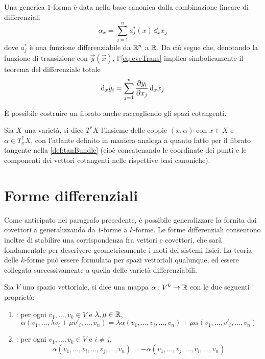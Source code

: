 Una generica $1$-forma è data nella base canonica dalla combinazione lineare di differenziali \begin{equation*}
\alpha_x = \sum_{j=1}^{n} a^*_j(x)\, \dd_x x_j
\end{equation*} 
dove $a_j^*$ è una funzione differenziabile da $\mathbb{R}^{n}$ a $\mathbb{R}$. Da ciò segue che, denotando la funzione di transizione con $\vec{y}(\vec{x})$, l'\autoref{eq:cvcTrans} implica simbolicamente il teorema del differenziale totale \begin{equation*}
\dd_x y_i = \sum_{j=1}^{n} \pdv{y_i}{x_j}\, \dd_x x_j
\end{equation*} 

È possibile costruire un fibrato anche raccogliendo gli spazi cotangenti.

\begin{definition}
  Sia $X$ una varietà, si dice  $T^*X$ l'insieme delle coppie $(x,\alpha)$ con $x \in X$ e $\alpha \in T^*_x X$, con l'atlante definito in maniera analoga a quanto fatto per il fibrato tangente nella \autoref{def:tanBundle} (cioè concatenando le coordinate dei punti e le componenti dei vettori cotangenti nelle rispettive basi canoniche).
\end{definition}

\section{Forme differenziali}
Come anticipato nel paragrafo precedente, è possibile generalizzare la  fornita dai covettori a  generalizzando da $1$-forme a $k$-forme. Le forme differenziali consentono inoltre di stabilire una corrispondenza fra vettori e covettori, che sarà fondamentale per descrivere geometricamente i moti dei sistemi fisici. La teoria delle $k$-forme può essere formulata per spazi vettoriali qualunque, ed essere collegata successivamente a quella delle varietà differenziabili.

\begin{definition}
  Sia $V$ uno spazio vettoriale, si dice  una mappa $\alpha: V^k \to \mathbb{R}$ con le due seguenti proprietà:
  \begin{enumerate}
    \item {}: per ogni $v_1, \ldots, v_k \in V$ e $\lambda,\mu \in \mathbb{R}$, \begin{equation*}
      \alpha(v_1, \ldots, \lambda v_i + \mu v'_i, \ldots, v_n) = \lambda \alpha(v_1, \ldots, v_i, \ldots, v_n) + \mu \alpha(v_1, \ldots, v'_i, \ldots, v_n)
    \end{equation*} 
    \item {}: per ogni $v_1, \ldots, v_k \in V$ e $i\neq j$, \begin{equation*}
    \alpha(v_1, \ldots, v_i, \ldots, v_j, \ldots, v_n) = 
    - \alpha(v_1, \ldots, v_j, \ldots, v_i, \ldots, v_n)
    \end{equation*} 
  \end{enumerate}
\end{definition}

